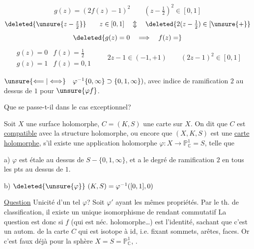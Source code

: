 \[
g(z)=(2f(z)-1)^2\qquad(z-\tfrac12)^2\in[0,1]
\]
\[
\deleted{\unsure{z-\tfrac z2}}\qquad z\in[0,1]\quad\Updownarrow\quad
\deleted{2(z-\tfrac12)\in[\unsure{+}}\]
\[\deleted{g(z)=0\quad\Longrightarrow\quad f(z)=}\]
\[
\begin{array}{ll}g(z)=0&f(z)=\tfrac12\\g(z)=1&f(z)=0,1\end{array}
\qquad2z-1\in(-1,+1)\qquad(2z-1)^2\in[0,1]
\]

$\unsure{\Longleftarrow|\Longleftrightarrow}\quad\varphi^{-1}\{0,\infty\}\supset\{0,1,\infty\})$,
avec indice de
ramification $2$ au dessus de $1$ pour $\unsure{\varphi f}$.

 Que se passe-t-il dans le cas exceptionnel?

Soit $X$ une surface holomorphe, $C=(K,S)$ une
carte sur $X$. On dit que $C$ est \uline{compatible}
avec la structure holomorphe, ou encore
que $(X,K,S)$ est une \uline{carte holomorphe},
s'il existe une application holomorphe
$\varphi:X\longrightarrow\mathbb{P}^1_{\mathbb{C}}=S$, telle que

a) $\varphi$ est étale au dessus de $S-\{0,1,\infty\}$, et
a le degré de ramification $2$ en tous les
pts au dessus de $1$.

b) $\deleted{\unsure{\varphi}}\ (K,S)=\varphi^{-1}([0,1],0)$

\uline{Question} Unicité d'un tel $\varphi$? Soit $\varphi'$ ayant
les mêmes propriétés. Par le th. de classification,
il existe un unique isomorphisme de
  rendant commutatif
La question est donc si $f$ (qui est néc.
holomorphe\ldots) est l'identité, sachant
que c'est un autom. de la carte $C$
qui est isotope à id, i.e. fixant sommets,
arêtes, faces. Or c'est faux déjà pour
la sphère $X=S=\mathbb{P}^1_{\mathbb{C}}$, .

